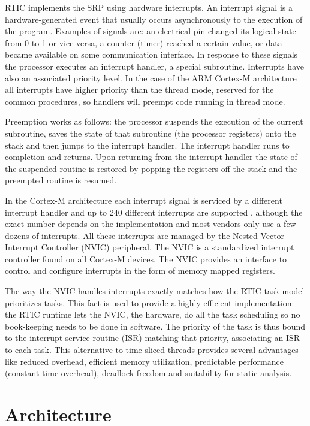 RTIC implements the SRP using hardware interrupts. An interrupt signal is a hardware-generated event that usually occurs asynchronously to the execution of the program. Examples of signals are: an electrical pin changed its logical state from 0 to 1 or vice versa, a counter (timer) reached a certain value, or data became available on some communication interface. In response to these signals the processor executes an interrupt handler, a special subroutine. Interrupts have also an associated priority level. In the case of the ARM Cortex-M architecture all interrupts have higher priority than the thread mode, reserved for the common procedures, so handlers will preempt code running in thread mode.

Preemption works as follows: the processor suspends the execution of the current subroutine, saves the state of that subroutine (the processor registers) onto the stack and then jumps to the interrupt handler. The interrupt handler runs to completion and returns. Upon returning from the interrupt handler the state of the suspended routine is restored by popping the registers off the stack and the preempted routine is resumed.

In the Cortex-M architecture each interrupt signal is serviced by a different interrupt handler and up to 240 different interrupts are supported \cite{definitive-guide-cortex}, although the exact number depends on the implementation and most vendors only use a few dozens of interrupts. All these interrupts are managed by the Nested Vector Interrupt Controller (NVIC) peripheral. The NVIC is a standardized interrupt controller found on all Cortex-M devices. The NVIC provides an interface to control and configure interrupts in the form of memory mapped registers.

The way the NVIC handles interrupts \cite{interrupts-handling} exactly matches how the RTIC task model prioritizes tasks. This fact is used to provide a highly efficient implementation: the RTIC runtime lets the NVIC, the hardware, do all the task scheduling so no book-keeping needs to be done in software. The priority of the task is thus bound to the interrupt service routine (ISR) matching that priority, associating an ISR to each task. This alternative to time sliced threads provides several advantages like reduced overhead, efficient memory utilization, predictable performance (constant time overhead), deadlock freedom and suitability for static analysis.

\section{Architecture}

